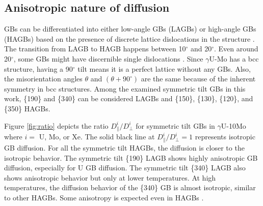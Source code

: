 \documentclass{elsarticle}
\providecommand{\DIFadd}[1]{{\protect\color{blue} \sf #1}} %
\providecommand{\DIFdel}[1]{}
\providecommand{\DIFaddbegin}{} %
\providecommand{\DIFaddend}{} %
\providecommand{\DIFdelbegin}{} %
\providecommand{\DIFdelend}{} %
\begin{document}
\subsection{\DIFadd{Anisotropic nature of diffusion}}

\DIFadd{GBs can be differentiated into either low-angle GBs (LAGBs) or high-angle GBs (HAGBs) based on the presence of discrete lattice dislocations in the structure \cite{winning2010}. The transition from LAGB to HAGB happens between 10$^{\circ}$ and 20$^{\circ}$. Even around 20$^{\circ}$, some GBs might have discernible single dislocations \cite{winning2005}. Since $\gamma$U-Mo has a bcc structure, having a 90$^{\circ}$ tilt means it is a perfect lattice without any GBs. Also, the misorientation }\DIFaddend angles $\theta$ and \DIFdelbegin \DIFdel{$90-\theta$ }\DIFdelend \DIFaddbegin \DIFadd{$(\theta+90^{\circ})$ }\DIFaddend are the same because of the inherent symmetry in bcc structures. \DIFaddbegin \DIFadd{Among the examined symmetric tilt GBs in this work, \{190\} and \{340\} can be considered LAGBs and \{150\}, \{130\}, \{120\}, and \{350\} HAGBs.
}\DIFaddend 

\DIFaddbegin \DIFadd{Figure \ref{fig:ratio} depicts the ratio $D^i_{\parallel} / D^i_{\perp}$ for symmetric tilt GBs in $\gamma$U-10Mo where $i =$ U, Mo, or Xe. The solid black line at $D^i_{\parallel} / D^i_{\perp} = 1$ represents isotropic GB diffusion. For all the symmetric tilt HAGBs, the diffusion is closer to the isotropic behavior. The symmetric tilt \{190\} LAGB shows highly anisotropic GB diffusion, especially for U GB diffusion. The symmetric tilt \{340\} LAGB also shows anisotropic behavior but only at lower temperatures. At high temperatures, the diffusion behavior of the \{340\} GB is almost isotropic, similar to other HAGBs. Some anisotropy is expected even in HAGBs \cite{mishin1997}.
}
\end{document}
